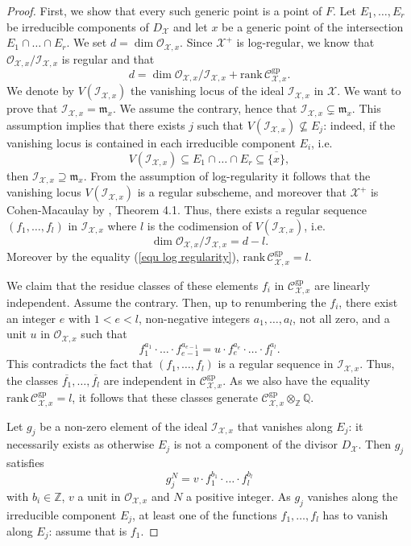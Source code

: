 \documentclass{amsart}%
\numberwithin{equation}{subsection}
\theoremstyle{plain2}
\theoremstyle{definition2}
\theoremstyle{stepstyle}
\theoremstyle{point}
\theoremstyle{subpoint}
\newcommand{\Z}{\ensuremath{\mathbb{Z}}}
\newcommand{\Q}{\ensuremath{\mathbb{Q}}}
\newcommand{\cX}{\ensuremath{\mathscr{X}}}
\newcommand{\caC}{\ensuremath{\mathcal{C}}}
\newcommand{\caO}{\ensuremath{\mathcal{O}}}
\newcommand{\caI}{\ensuremath{\mathcal{I}}}
\newcommand{\gp}{\mathrm{gp}}
\begin{document}
\begin{proof}
First, we show that every such generic point is a point of $F$. Let $E_1,\ldots,E_r$ be irreducible components of $D_{\cX}$ and let $x$ be a generic point of the intersection $E_1\cap\ldots\cap E_r$. We set $d=\dim \mathcal{O}_{\cX,x}$. Since $\cX^+$ is log-regular, we know that $\mathcal{O}_{\cX,x}/\mathcal{I}_{\cX,x}$ is regular and that \begin{equation} \label{equ log regularity}
d=\dim \mathcal{O}_{\cX,x}/\mathcal{I}_{\cX,x}+\mathrm{rank}\,\mathcal{C}^{\gp}_{\cX,x}.\end{equation} We denote by $V(\caI_{\cX,x})$ the vanishing locus of the ideal $\caI_{\cX,x}$ in $\cX$.
We want to prove that $\caI_{\cX,x}= \mathfrak{m}_x$. We assume the contrary, hence that $\caI_{\cX,x} \subsetneq \mathfrak{m}_x$. This assumption implies that there exists $j$ such that $V(\caI_{\cX,x}) \nsubseteq E_j$: indeed, if the vanishing locus is contained in each irreducible component $E_i$, i.e. $$V(\caI_{\cX,x}) \subseteq E_1 \cap \ldots \cap E_r \subseteq \overline{\{x\}},$$ then $\caI_{\cX,x} \supseteq \mathfrak{m}_x$. From the assumption of log-regularity it follows that the vanishing locus $V(\caI_{\cX,x})$ is a regular subscheme, and moreover that $\cX^+$ is Cohen-Macaulay by \cite{Kato1994a}, Theorem 4.1. Thus, there exists a regular sequence $(f_1,\ldots,f_l)$ in $\caI_{\cX,x}$ where $l$ is the codimension of $V(\caI_{\cX,x})$, i.e. $$ \dim \mathcal{O}_{\cX,x}/\mathcal{I}_{\cX,x} = d-l.$$ Moreover by the equality (\ref{equ log regularity}), $\mathrm{rank}\,\mathcal{C}^{\gp}_{\cX,x} = l$.
 
We claim that the residue classes of these elements $f_i$ in $\mathcal{C}_{\cX,x}^{\gp}$ are linearly independent. Assume the contrary. Then, up to renumbering the $f_i$, there exist an  integer $e$ with $1< e< l$, non-negative integers $a_1,\ldots,a_l$, not all zero, and a unit $u$ in $\mathcal{O}_{\cX,x}$ such that $$f_1^{a_1}\cdot \ldots \cdot f_{e-1}^{a_{e-1}}=u\cdot f_e^{a_e}\cdot \ldots \cdot f_l^{a_l}.$$ This contradicts the fact that $(f_1,\ldots,f_l)$ is a regular sequence in $\mathcal{I}_{\cX,x}$. Thus, the classes $\overline{f_1}, \ldots,\overline{f_l}$ are independent in $\caC_{\cX,x}^\gp$. As we also have the equality $\mathrm{rank}\,\mathcal{C}^{\gp}_{\cX,x}=l$, it follows that these classes generate $\caC_{\cX,x}^\gp \otimes_{\Z} \Q$.

Let $g_j$ be a non-zero element of the ideal $\caI_{\cX,x}$ that vanishes along $E_j$: it necessarily exists as otherwise $E_j$ is not a component of the divisor $D_{\cX}$. Then $g_j$ satisfies $$g_{j}^N = v \cdot f_1^{b_1} \cdot \ldots \cdot f_l^{b_l}$$ with $b_i \in \Z$, $v$ a unit in $\caO_{\cX,x}$ and $N$ a positive integer. As $g_j$ vanishes along the irreducible component $E_j$, at least one of the functions $f_1,\ldots,f_l$ has to vanish along $E_j$: assume that is $f_1$.


\end{proof}
\end{document}
